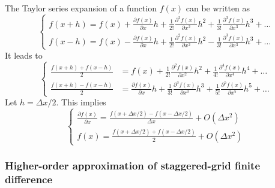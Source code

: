 The Taylor series expansion of a function $f(x)$ can be written as
\begin{equation}\label{eq:Taylor}
\left\{
\begin{split}
f(x+h)=f(x)+\frac{\partial f(x)}{\partial x}h+\frac{1}{2!}\frac{\partial^2 f(x)}{\partial x^2}h^2+\frac{1}{3!}\frac{\partial^3 f(x)}{\partial x^3}h^3+\ldots\\
f(x-h)=f(x)-\frac{\partial f(x)}{\partial x}h+\frac{1}{2!}\frac{\partial^2 f(x)}{\partial x^2}h^2-\frac{1}{3!}\frac{\partial^3 f(x)}{\partial x^3}h^3+\ldots
\end{split}
\right.
\end{equation}
It leads to
\begin{equation}
\left\{
\begin{split}
\frac{f(x+h)+f(x-h)}{2}
&=f(x)+\frac{1}{2!}\frac{\partial^2 f(x)}{\partial x^2}h^2+\frac{1}{4!}\frac{\partial^4 f(x)}{\partial x^4}h^4+\ldots\\
\frac{f(x+h)-f(x-h)}{2}
&=\frac{\partial f(x)}{\partial x}h+\frac{1}{3!}\frac{\partial^3 f(x)}{\partial x^3}h^3+\frac{1}{5!}\frac{\partial^5 f(x)}{\partial x^5}h^5+\ldots
\end{split}
\right.
\end{equation}
Let $h=\Delta x/2$. This implies
\begin{equation}\label{eq:approx}
\left\{
\begin{split}
\frac{\partial f(x)}{\partial x}=\frac{f(x+\Delta x/2)-f(x-\Delta x/2)}{\Delta x}+O(\Delta x^2)\\
f(x)=\frac{f(x+\Delta x/2)+f(x-\Delta x/2)}{2}+O(\Delta x^2)
\end{split}
\right.
\end{equation}

\subsubsection{Higher-order approximation of staggered-grid finite difference}

